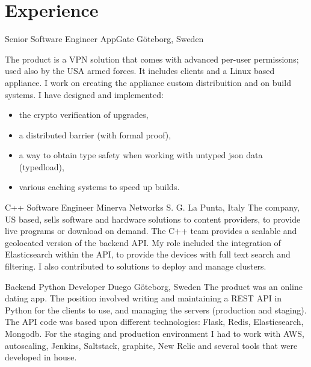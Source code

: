 \documentclass[11pt,a4paper,sans]{moderncv} %
\begin{document}
\section{Experience}

    {Senior Software Engineer}
    {AppGate}
    {G\"{o}teborg, Sweden}
    {}
    {
        The product is a VPN solution that comes with advanced per-user
        permissions; used also by the USA armed forces. It includes clients and a Linux based appliance.
        \newline
        I work on creating the appliance custom distribuition and on build systems.
        \newline
        I have designed and implemented:
        \begin{itemize}
        \item the crypto verification of upgrades,
        \item a distributed barrier (with formal proof),
        \item a way to obtain type safety when working with untyped json data (typedload),
        \item various caching systems to speed up builds.
        \end{itemize}
    }

    {C++ Software Engineer}
    {Minerva Networks}
    {S. G. La Punta, Italy}
    {}
    {
        The company, US based, sells software and hardware solutions to content providers, to provide live programs or download on demand.
        \newline
        The C++ team provides a scalable and geolocated version of the backend API.
        \newline
        My role included the integration of Elasticsearch within the API, to provide the devices with full text search and filtering.
        I also contributed to solutions to deploy and manage clusters.
    }

    {Backend Python Developer}
    {Duego}
    {G\"{o}teborg, Sweden}
    {}
    {
        The product was an online dating app.
        The position involved writing and maintaining a REST API in Python for the clients to use, and managing the servers (production and staging).
        \newline
        The API code was based upon different technologies: Flask, Redis, Elasticsearch, Mongodb.
        For the staging and production environment I had to work with AWS, autoscaling, Jenkins, Saltstack, graphite, New Relic and several tools that were developed in house.
    }
\end{document}
